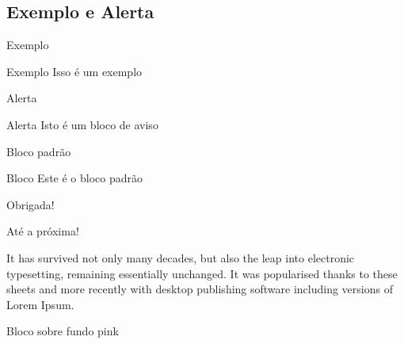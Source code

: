 \documentclass[aspectratio=169]{beamer}
\begin{document}
\subsection{Exemplo e Alerta}

\begin{frame}{Exemplo}

\begin{exampleblock}{Exemplo}
    Isso é um exemplo
\end{exampleblock}
    
\end{frame}

\begin{frame}{Alerta}

\begin{alertblock}{Alerta}
    Isto é um bloco de aviso
\end{alertblock}
    
\end{frame}

\begin{frame}{Bloco padrão}

\begin{block}{Bloco}
    Este é o bloco padrão
\end{block}
    
\end{frame}

\begin{frame}[standout]
  Obrigada!
\end{frame}

\begin{frame}[standout={bg=fisica300, fg=white}]
  Até a próxima!
\end{frame}

\begin{frame}[standout]
  \begin{standoutbox}
    It has survived not only many decades, but also the leap into electronic typesetting, remaining essentially unchanged. It was popularised thanks to these sheets and more recently with desktop publishing software including versions of Lorem Ipsum.
  \end{standoutbox}
\end{frame}

\begin{frame}[standout={bg=pink}]
  \begin{standoutbox}
    Bloco sobre fundo pink
  \end{standoutbox}
\end{frame}
\end{document}
